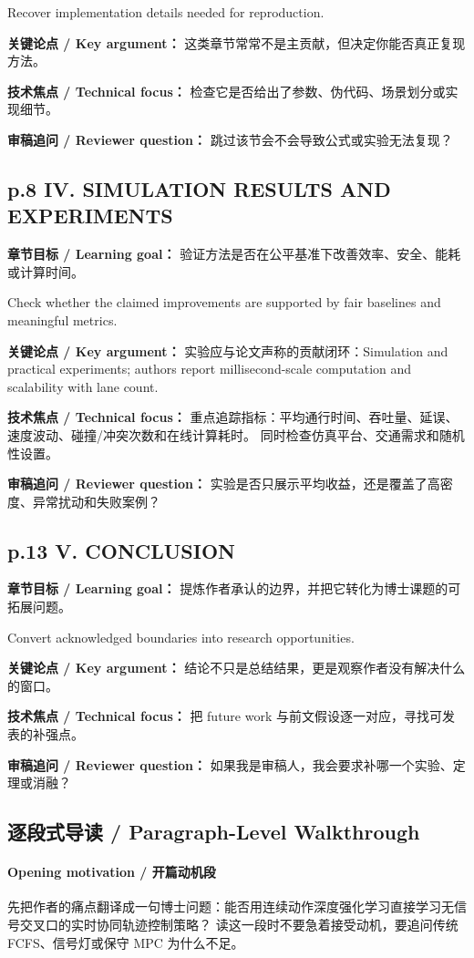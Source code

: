 \documentclass[UTF8,a4paper,11pt,fontset=fandol]{ctexart}
\begin{document}
Recover implementation details needed for reproduction.

\textbf{关键论点 / Key argument：} 这类章节常常不是主贡献，但决定你能否真正复现方法。

\textbf{技术焦点 / Technical focus：} 检查它是否给出了参数、伪代码、场景划分或实现细节。

\textbf{审稿追问 / Reviewer question：} 跳过该节会不会导致公式或实验无法复现？

\subsection*{p.8 IV. SIMULATION RESULTS AND EXPERIMENTS}
\textbf{章节目标 / Learning goal：} 验证方法是否在公平基准下改善效率、安全、能耗或计算时间。

Check whether the claimed improvements are supported by fair baselines and meaningful metrics.

\textbf{关键论点 / Key argument：} 实验应与论文声称的贡献闭环：Simulation and practical experiments; authors report millisecond-scale computation and scalability with lane count.

\textbf{技术焦点 / Technical focus：} 重点追踪指标：平均通行时间、吞吐量、延误、速度波动、碰撞/冲突次数和在线计算耗时。 同时检查仿真平台、交通需求和随机性设置。

\textbf{审稿追问 / Reviewer question：} 实验是否只展示平均收益，还是覆盖了高密度、异常扰动和失败案例？

\subsection*{p.13 V. CONCLUSION}
\textbf{章节目标 / Learning goal：} 提炼作者承认的边界，并把它转化为博士课题的可拓展问题。

Convert acknowledged boundaries into research opportunities.

\textbf{关键论点 / Key argument：} 结论不只是总结结果，更是观察作者没有解决什么的窗口。

\textbf{技术焦点 / Technical focus：} 把 future work 与前文假设逐一对应，寻找可发表的补强点。

\textbf{审稿追问 / Reviewer question：} 如果我是审稿人，我会要求补哪一个实验、定理或消融？


\subsection{逐段式导读 / Paragraph-Level Walkthrough}
\paragraph{Opening motivation / 开篇动机段}先把作者的痛点翻译成一句博士问题：能否用连续动作深度强化学习直接学习无信号交叉口的实时协同轨迹控制策略？ 读这一段时不要急着接受动机，要追问传统 FCFS、信号灯或保守 MPC 为什么不足。
\end{document}
